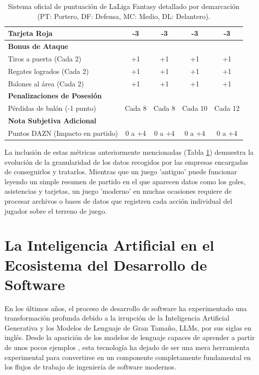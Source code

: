 \begin{table}[H]
\begin{tabular}{|p{4.5cm}|c|c|c|c|}
        Tarjeta Roja & -3 & -3 & -3 & -3 \\ \hline
        \textbf{Bonus de Ataque} & \multicolumn{4}{c|}{} \\ \hline
        Tiros a puerta (Cada 2) & +1 & +1 & +1 & +1 \\ \hline
        Regates logrados (Cada 2) & +1 & +1 & +1 & +1 \\ \hline
        Balones al área (Cada 2) & +1 & +1 & +1 & +1 \\ \hline
        \textbf{Penalizaciones de Posesión} & \multicolumn{4}{c|}{} \\ \hline
        Pérdidas de balón (-1 punto) & Cada 8 & Cada 8 & Cada 10 & Cada 12 \\ \hline
        \textbf{Nota Subjetiva Adicional} & \multicolumn{4}{c|}{} \\ \hline
        Puntos DAZN (Impacto en partido) & 0 a +4 & 0 a +4 & 0 a +4 & 0 a +4 \\ \hline
    \end{tabular}
    \caption{Sistema oficial de puntuación de LaLiga Fantasy detallado por demarcación (PT: Portero, DF: Defensa, MC: Medio, DL: Delantero).}
    \label{tab:puntuacion_laliga_fantasy}
\end{table}

La inclusión de estas métricas anteriormente mencionadas (Tabla \ref{tab:puntuacion_laliga_fantasy}) demuestra la evolución de la granularidad de los datos recogidos por las empresas encargadas de conseguirlos y tratarlos. Mientras que un juego 'antiguo' puede funcionar leyendo un simple resumen de partido en el que aparecen datos como los goles, asistencias y tarjetas, un juego 'moderno' en muchas ocasiones requiere de procesar archivos o bases de datos que registren cada acción individual del jugador sobre el terreno de juego.

\section{La Inteligencia Artificial en el Ecosistema del Desarrollo de Software}
\label{sec:ia_desarrollo_software}

En los últimos años, el proceso de desarrollo de software ha experimentado una transformación profunda debido a la irrupción de la Inteligencia Artificial Generativa y los Modelos de Lenguaje de Gran Tamaño, LLMs, por sus siglas en inglés. Desde la aparición de los modelos de lenguaje capaces de aprender a partir de unos pocos ejemplos \cite{brown_fewshot}, esta tecnología ha dejado de ser una mera herramienta experimental para convertirse en un componente completamente fundamental en los flujos de trabajo de ingeniería de software modernos.

